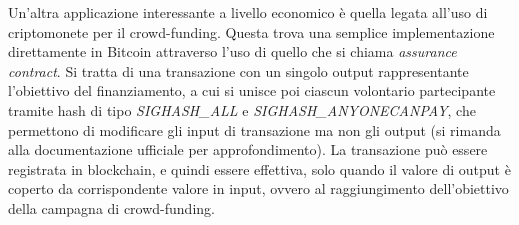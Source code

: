         Un'altra applicazione interessante a livello economico è quella legata all'uso di criptomonete per il crowd-funding. Questa trova una semplice implementazione direttamente in Bitcoin attraverso l'uso di quello che si chiama \emph{assurance contract}. Si tratta di una transazione con un singolo output rappresentante l'obiettivo del finanziamento, a cui si unisce poi ciascun volontario partecipante tramite hash di tipo \emph{SIGHASH\_ALL} e \emph{SIGHASH\_ANYONECANPAY}, che permettono di modificare gli input di transazione ma non gli output (si rimanda alla documentazione ufficiale per approfondimento). La transazione può essere registrata in blockchain, e quindi essere effettiva, solo quando il valore di output è coperto da corrispondente valore in input, ovvero al raggiungimento dell'obiettivo della campagna di crowd-funding.
     
